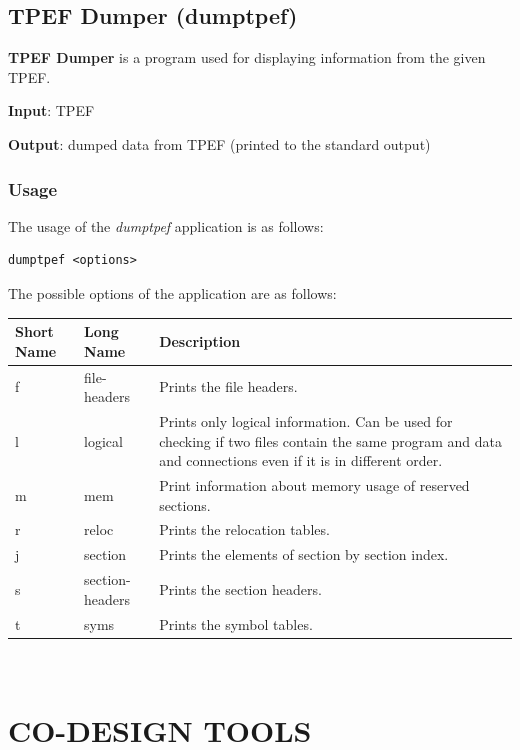 \documentclass[twoside]{tceusermanual}
\begin{document}
\section{TPEF Dumper (dumptpef)}
\label{section:dumptpef}

\textbf{TPEF Dumper} is a program used for displaying information from the
given TPEF.

\textbf{Input}: TPEF

\textbf{Output}: dumped data from TPEF (printed to the standard output)

\subsection{Usage}

The usage of the \emph{dumptpef} application is as follows:

\begin{verbatim}
dumptpef <options>
\end{verbatim}

The possible options of the application are as follows:\\

\begin{tabular}{p{}p{}
                p{}}
\textbf{Short Name} &\textbf{Long Name} &\textbf{Description} \\
\hline
f & file-headers & Prints the file headers. \\
l & logical & Prints only logical information. Can be used for
checking if two files contain the same program and data and connections even if
it is in different order. \\
m & mem & Print information about memory usage of reserved sections. \\
r & reloc & Prints the relocation tables. \\
j & section & Prints the elements of section by section index. \\
s & section-headers & Prints the section headers. \\
t & syms & Prints the symbol tables. \\
\end{tabular}\\



\chapter{CO-DESIGN TOOLS}
\label{section:codesign}
\end{document}
